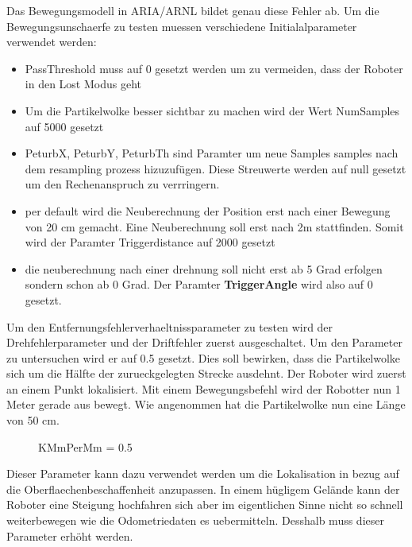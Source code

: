 \documentclass{article}
\begin{document}
Das Bewegungsmodell in ARIA/ARNL bildet genau diese Fehler ab.
Um die Bewegungsunschaerfe zu testen muessen verschiedene Initialalparameter verwendet werden:
\begin{itemize}
\item PassThreshold muss auf 0 gesetzt werden um zu vermeiden, dass der Roboter in den Lost Modus geht
\item Um die Partikelwolke besser sichtbar zu machen wird der Wert NumSamples auf 5000 gesetzt
\item PeturbX, PeturbY, PeturbTh sind Paramter um neue Samples samples nach dem resampling prozess hizuzuf\"ugen. Diese Streuwerte werden auf null gesetzt um den Rechenanspruch zu verrringern.
\item per default wird die Neuberechnung der Position erst nach einer Bewegung von 20 cm gemacht. Eine Neuberechnung soll erst nach 2m stattfinden. Somit wird der Paramter Triggerdistance auf 2000 gesetzt 
\item die neuberechnung nach einer drehnung soll nicht erst ab 5 Grad erfolgen sondern schon ab 0 Grad. Der Paramter \textbf{TriggerAngle} wird also auf 0 gesetzt.
\end{itemize}

Um den Entfernungsfehlerverhaeltnissparameter zu testen wird der Drehfehlerparameter und der Driftfehler zuerst ausgeschaltet. Um den Parameter zu untersuchen wird er auf 0.5 gesetzt. Dies soll bewirken, dass die Partikelwolke sich um die H\"alfte der zurueckgelegten Strecke ausdehnt. Der Roboter wird zuerst an einem Punkt lokalisiert. Mit einem Bewegungsbefehl wird der Robotter nun 1 Meter gerade aus bewegt. Wie angenommen hat die Partikelwolke nun eine L\"ange von 50 cm. 

\begin{figure}[KMmPerMmTest]
  \centering
  \caption{KMmPerMm = 0.5}
  \label{KMmPerMmTest}
\end{figure}


Dieser Parameter kann dazu verwendet werden um die Lokalisation in bezug auf die Oberflaechenbeschaffenheit anzupassen. In einem h\"ugligem Gel\"ande kann der Roboter eine Steigung hochfahren sich aber im eigentlichen Sinne nicht so schnell weiterbewegen wie die Odometriedaten es uebermitteln. Desshalb muss dieser Parameter erh\"oht werden.
\end{document}
